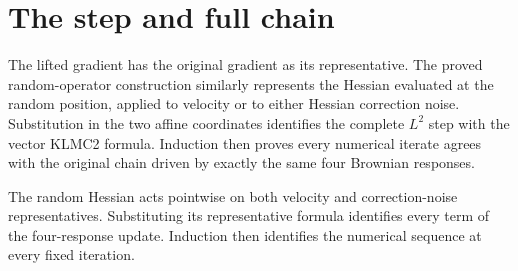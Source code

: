 \documentclass[11pt,a4paper]{article}
\begin{document}
\section{\texorpdfstring{The step and full chain}{The step and full chain}}


The lifted gradient has the original gradient as its representative. The proved random-operator construction similarly represents the Hessian evaluated at the random position, applied to velocity or to either Hessian correction noise. Substitution in the two affine coordinates identifies the complete \(L^{2}\) step with the vector KLMC2 formula. Induction then proves every numerical iterate agrees with the original chain driven by exactly the same four Brownian responses.



The random Hessian acts pointwise on both velocity and correction-noise representatives. Substituting its representative formula identifies every term of the four-response update. Induction then identifies the numerical sequence at every fixed iteration.
\end{document}
